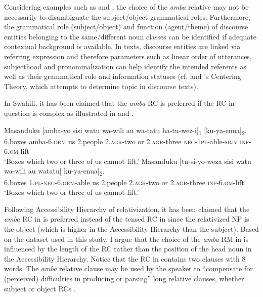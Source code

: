 \documentclass[output=paper,colorlinks,citecolor=brown]{langscibook}
\begin{document}
Considering examples such as  and , the choice of the \textit{amba} relative may not be necessarily to disambiguate the subject/object grammatical roles. Furthermore, the grammatical role (subject/object) and function (agent/theme) of discourse entities belonging to the same/different noun classes can be identified if adequate contextual background is available. In texts, discourse entities are linked via referring expression and therefore parameters such as linear order of utterances, subjecthood and pronominalization can help identify the intended referents as well as their grammatical role and information statuses (cf. \citealt{GroszEtAl1995} and \citeauthor{GroszSidner1998}'s \citeyear{GroszSidner1998} Centering Theory, which attempts to determine topic in discourse texts).

In Swahili, it has been claimed that the \textit{amba} RC is preferred if the RC in question is complex as illustrated in  and .

\ea%
    \label{ex:mwamzandi:12}
    \gll    Masanduku  [amba-yo sisi watu wa-wili au wa-tatu ha-tu-wez-i]\textsubscript{1} [ku-ya-enua]\textsubscript{2}.\\
            6.boxes  amba\textsc{-6.orm} us 2.people \textsc{2.agr-}two or \textsc{2.agr-}three  \textsc{neg-1pl-}able\textsc{-sbjv} \textsc{inf-6.om-}lift\\
    \glt    ‘Boxes which two or three of us cannot lift.’
\ex%
    \label{ex:mwamzandi:13}
    \gll    Masanduku [tu-si-yo-weza sisi watu wa-wili au watatu] ku-ya-enua]\textsubscript{2}.\\
            6.boxes  \textsc{1.pl-neg-6.orm-}able us 2.people \textsc{2.agr-}two or \textsc{2.agr-}three \textsc{inf-6.om-}lift\\
    \glt    ‘Boxes which two or three of us cannot lift.’ \hfill \citep[310]{Ashton1944}
\z

Following  Accessibility Hierarchy of relativization, it has been claimed that the \textit{amba} RC in  is preferred  instead of the tensed RC in  since the relativized NP is the object (which is higher in the Accessibility Hierarchy than the subject). Based on the dataset used in this study, I argue that the choice of the \textit{amba} RM in  is influenced by the length of the RC rather than the position of the head noun in the Accessibility Hierarchy. Notice that the RC in  contains two clauses with 8 words. The \textit{amba} relative clause may be used by the speaker to “compensate for (perceived) difficulties in producing or parsing” long relative clauses, whether subject or object RCs \citep[133]{Green1996}.
\end{document}
